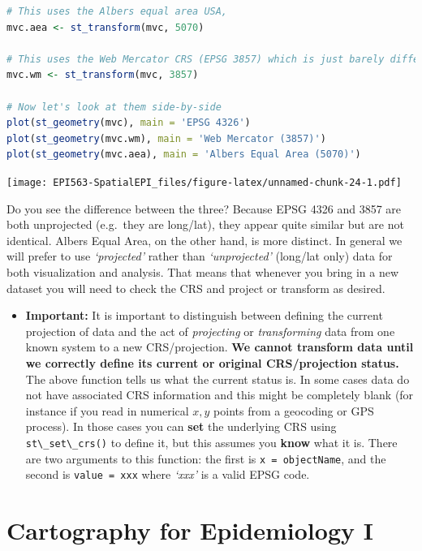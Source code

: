 \documentclass[
]{book}
\newcommand{\passthrough}[1]{#1}
\newenvironment{rmdblock}[1]
  {%
  \begin{itemize}
  \renewcommand{\labelitemi}{
    \raisebox{-.7\height}[0pt][0pt]{
      {\setkeys{Gin}{width=3em,keepaspectratio}\texttt{[image: images/\#1]}}
    }
  }
  \item
  }
  {
  \end{itemize}
  }
\newenvironment{rmdcaution}
  {\begin{rmdblock}{caution}}
  {\end{rmdblock}}
\begin{document}
\begin{lstlisting}[language=R]
# This uses the Albers equal area USA, 
mvc.aea <- st_transform(mvc, 5070)

# This uses the Web Mercator CRS (EPSG 3857) which is just barely different from EPSG 4326
mvc.wm <- st_transform(mvc, 3857)

# Now let's look at them side-by-side
plot(st_geometry(mvc), main = 'EPSG 4326')
plot(st_geometry(mvc.wm), main = 'Web Mercator (3857)')
plot(st_geometry(mvc.aea), main = 'Albers Equal Area (5070)')
\end{lstlisting}

\texttt{[image: EPI563-SpatialEPI\_files/figure-latex/unnamed-chunk-24-1.pdf]}

Do you see the difference between the three? Because EPSG 4326 and 3857 are both unprojected (e.g.~they are long/lat), they appear quite similar but are not identical. Albers Equal Area, on the other hand, is more distinct. In general we will prefer to use \emph{`projected'} rather than \emph{`unprojected'} (long/lat only) data for both visualization and analysis. That means that whenever you bring in a new dataset you will need to check the CRS and project or transform as desired.

\begin{rmdcaution}
\textbf{Important:} It is important to distinguish between defining the current projection of data and the act of \emph{projecting} or \emph{transforming} data from one known system to a new CRS/projection. \textbf{We cannot transform data until we correctly define its current or original CRS/projection status.} The above function tells us what the current status is. In some cases data do not have associated CRS information and this might be completely blank (for instance if you read in numerical \(x,y\) points from a geocoding or GPS process). In those cases you can \textbf{set} the underlying CRS using \passthrough{\lstinline!st\_set\_crs()!} to define it, but this assumes you \textbf{know} what it is. There are two arguments to this function: the first is \passthrough{\lstinline!x = objectName!}, and the second is \passthrough{\lstinline!value = xxx!} where \emph{`xxx'} is a valid EPSG code.
\end{rmdcaution}

\hypertarget{cartography-for-epidemiology-i}{%
\chapter{Cartography for Epidemiology I}\label{cartography-for-epidemiology-i}}
\end{document}
